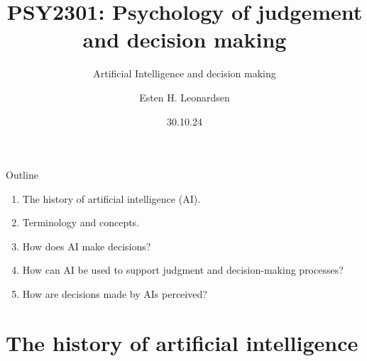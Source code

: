 \documentclass[8pt]{beamer}
\date{30.10.24}
\title{PSY2301: Psychology of judgement and decision making}
\subtitle{Artificial Intelligence and decision making}
\author{Esten H. Leonardsen}
\begin{document}
	\begin{frame}
		\maketitle
	\end{frame}

	\begin{frame}{Outline}
		\begin{enumerate}
			\item The history of artificial intelligence (AI).
			\item Terminology and concepts.
			\item How does AI make decisions?
			\item How can AI be used to support judgment and decision-making processes?
			\item How are decisions made by AIs perceived?
		\end{enumerate}
	\end{frame}


	\section{The history of artificial intelligence}
\end{document}
